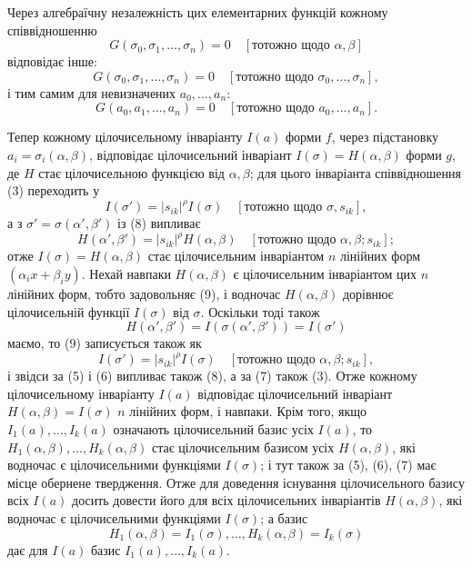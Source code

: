 \documentclass[11pt]{article}
\begin{document}
Через алгебраїчну незалежність цих елементарних функцій кожному співвідношенню
\begin{equation}
        G(\sigma_0,\sigma_1,\ldots,\sigma_n)=0
        \quad [\text{тотожно щодо \(\alpha,\beta\)}]
\end{equation}
відповідає інше:
\begin{equation}
        G(\sigma_0,\sigma_1,\ldots,\sigma_n)=0
        \quad [\text{тотожно щодо \(\sigma_0,\ldots,\sigma_n\)}],
\end{equation}
і тим самим для невизначених \(a_0,\ldots,a_n\):
\begin{equation}
        G(a_0,a_1,\ldots,a_n)=0
        \quad [\text{тотожно щодо \(a_0,\ldots,a_n\)}].
\end{equation}

Тепер кожному цілочисельному інваріанту \(I(a)\) форми \(f\), через підстановку \(a_i=\sigma_i(\alpha,\beta)\), відповідає цілочисельний інваріант \(I(\sigma)=H(\alpha,\beta)\) форми \(g\), де \(H\) стає цілочисельною функцією від \(\alpha,\beta\); для цього інваріанта співвідношення (3) переходить у
\begin{equation}
        I(\sigma')=|s_{ik}|^\rho I(\sigma)
        \quad [\text{тотожно щодо \(\sigma,s_{ik}\)}],
\end{equation}
а з \(\sigma'=\sigma(\alpha',\beta')\) із (8) випливає
\begin{equation}
        H(\alpha',\beta')=|s_{ik}|^\rho H(\alpha,\beta)
        \quad [\text{тотожно щодо \(\alpha,\beta;s_{ik}\)}];
\end{equation}
отже \(I(\sigma)=H(\alpha,\beta)\) стає цілочисельним інваріантом \(n\) лінійних форм \((\alpha_i x+\beta_i y)\). Нехай навпаки \(H(\alpha,\beta)\) є цілочисельним інваріантом цих \(n\) лінійних форм, тобто задовольняє (9), і водночас \(H(\alpha,\beta)\) дорівнює цілочисельній функції \(I(\sigma)\) від \(\sigma\). Оскільки тоді також
\[
        H(\alpha',\beta')=I(\sigma(\alpha',\beta'))=I(\sigma')
\]
маємо, то (9) записується також як
\begin{equation*}
        I(\sigma')=|s_{ik}|^\rho I(\sigma)
        \quad [\text{тотожно щодо \(\alpha,\beta;s_{ik}\)}],\tag{9a}
\end{equation*}
і звідси за (5) і (6) випливає також (8), а за (7) також (3). Отже кожному цілочисельному інваріанту \(I(a)\) відповідає цілочисельний інваріант \(H(\alpha,\beta)=I(\sigma)\) \(n\) лінійних форм, і навпаки. Крім того, якщо \(I_1(a),\ldots,I_k(a)\) означають цілочисельний базис усіх \(I(a)\), то \(H_1(\alpha,\beta),\ldots,H_k(\alpha,\beta)\) стає цілочисельним базисом усіх \(H(\alpha,\beta)\), які водночас є цілочисельними функціями \(I(\sigma)\); і тут також за (5), (6), (7) має місце обернене твердження. Отже для доведення існування цілочисельного базису всіх \(I(a)\) досить довести його для всіх цілочисельних інваріантів \(H(\alpha,\beta)\), які водночас є цілочисельними функціями \(I(\sigma)\); а базис
\[
        H_1(\alpha,\beta)=I_1(\sigma),\ldots,H_k(\alpha,\beta)=I_k(\sigma)
\]
дає для \(I(a)\) базис \(I_1(a),\ldots,I_k(a)\).
\end{document}
